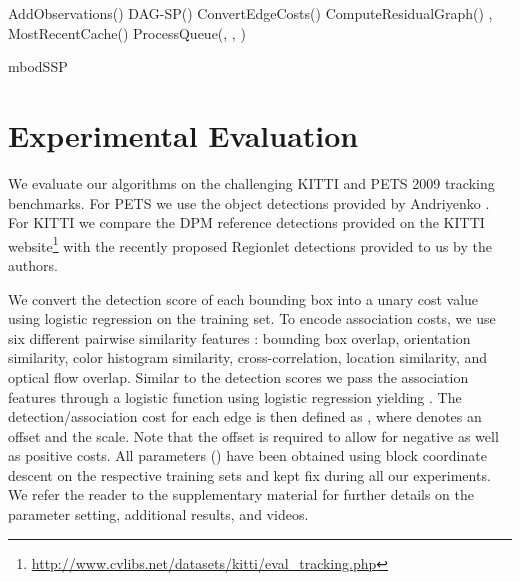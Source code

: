 \documentclass[10pt,twocolumn,letterpaper]{article}
\newcommand{\algref}[1]{Algo.~\ref{#1}}
\begin{document}
\begin{algorithm}[t]
{\small
  \DontPrintSemicolon
 AddObservations() 
\; 
   DAG-SP() \;
   ConvertEdgeCosts()\;  ComputeResidualGraph()\;
  ,\, \;
  \While{} {
    \;
    \tcp{,  }
     MostRecentCache() \;
\; 
    \tcp{\algref{algo:ssp_offline_dDijkstra}, line 10}
     ProcessQueue(, , )\; 
    }
    \Return{}\;
  \caption{mbodSSP}
  \label{algo:ssp_online_mbodDijkstra}
}
\end{algorithm}

%
 \section{Experimental Evaluation}
\label{sec:results}

We evaluate our algorithms on the challenging KITTI \cite{Geiger2012CVPR} and PETS 2009 \cite{Ferryman2009PETS} tracking benchmarks. For PETS we use the object detections provided by Andriyenko \etal \cite{Andriyenko2012CVPR}. For KITTI we compare the DPM reference detections \cite{Felzenszwalb2010PAMI} provided on the KITTI website\footnote{\url{http://www.cvlibs.net/datasets/kitti/eval\_tracking.php}} with the recently proposed Regionlet detections \cite{Wang2013ICCV} provided to us by the authors.

We convert the detection score of each bounding box  into a unary cost value  using logistic regression  on the training set.
To encode association costs, we use six different pairwise similarity features : bounding box overlap, orientation similarity, color histogram similarity, cross-correlation, location similarity, and optical flow overlap.
Similar to the detection scores we pass the association features through a logistic function using logistic regression yielding .
The detection/association cost for each edge  is then defined as , 
where  denotes an offset and  the scale. Note that the offset is required to allow for negative as well as positive costs.
All parameters () have been obtained using block coordinate descent on the respective training sets and kept fix during all our experiments. 
We refer the reader to the supplementary material for further details on the parameter setting, additional results, and videos. 
\end{document}

